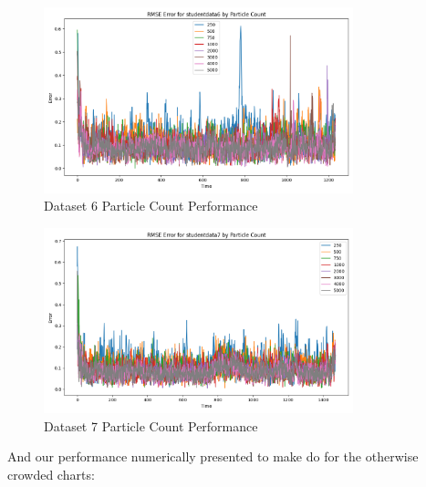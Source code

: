 \documentclass{article}
\begin{document}
\begin{figure}[H]
    \centering
    \includegraphics[width=0.8\textwidth]{./imgs/task2/studentdata6_rmse_particle_count.png}
    \caption{Dataset 6 Particle Count Performance}
\end{figure}

\begin{figure}[H]
    \centering
    \includegraphics[width=0.8\textwidth]{./imgs/task2/studentdata7_rmse_particle_count.png}
    \caption{Dataset 7 Particle Count Performance}
\end{figure}

And our performance numerically presented to make do for the otherwise crowded charts:
\end{document}
